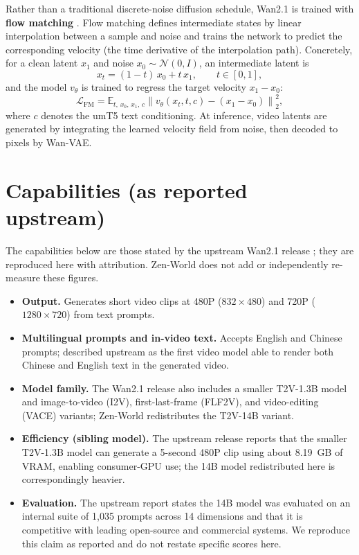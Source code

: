 \documentclass[11pt,a4paper]{article}
\begin{document}
Rather than a traditional discrete-noise diffusion schedule, Wan2.1 is trained with
\textbf{flow matching} \cite{lipman2023flow, wan2025report}. Flow matching defines intermediate
states by linear interpolation between a sample and noise and trains the network to predict the
corresponding velocity (the time derivative of the interpolation path). Concretely, for a clean
latent $x_1$ and noise $x_0 \sim \mathcal{N}(0, I)$, an intermediate latent is
\begin{equation}
    x_t = (1 - t)\, x_0 + t\, x_1, \qquad t \in [0, 1],
\end{equation}
and the model $v_\theta$ is trained to regress the target velocity $x_1 - x_0$:
\begin{equation}
    \mathcal{L}_{\text{FM}} = \mathbb{E}_{t,\, x_0,\, x_1,\, c}
    \left\lVert v_\theta(x_t, t, c) - (x_1 - x_0) \right\rVert_2^2,
\end{equation}
where $c$ denotes the umT5 text conditioning. At inference, video latents are generated by
integrating the learned velocity field from noise, then decoded to pixels by Wan-VAE.

\section{Capabilities (as reported upstream)}

The capabilities below are those stated by the upstream Wan2.1 release \cite{wan2025report}; they
are reproduced here with attribution. Zen-World does not add or independently re-measure these
figures.

\begin{itemize}
    \item \textbf{Output.} Generates short video clips at 480P ($832\times480$) and 720P
    ($1280\times720$) from text prompts.
    \item \textbf{Multilingual prompts and in-video text.} Accepts English and Chinese prompts;
    described upstream as the first video model able to render both Chinese and English text in the
    generated video.
    \item \textbf{Model family.} The Wan2.1 release also includes a smaller T2V-1.3B model and
    image-to-video (I2V), first-last-frame (FLF2V), and video-editing (VACE) variants; Zen-World
    redistributes the T2V-14B variant.
    \item \textbf{Efficiency (sibling model).} The upstream release reports that the smaller
    T2V-1.3B model can generate a 5-second 480P clip using about 8.19~GB of VRAM, enabling
    consumer-GPU use; the 14B model redistributed here is correspondingly heavier.
    \item \textbf{Evaluation.} The upstream report states the 14B model was evaluated on an internal
    suite of 1{,}035 prompts across 14 dimensions and that it is competitive with leading
    open-source and commercial systems. We reproduce this claim as reported and do not restate
    specific scores here.
\end{itemize}
\end{document}
